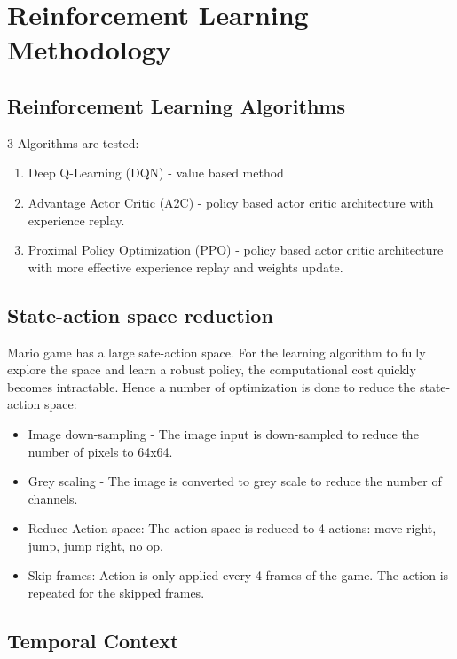 \documentclass[conference]{IEEEtran}
\begin{document}
\section{Reinforcement Learning Methodology}

\subsection{Reinforcement Learning Algorithms}

3 Algorithms are tested:

\begin{enumerate}
    \item Deep Q-Learning (DQN) - value based method
    \item Advantage Actor Critic (A2C) - policy based actor critic architecture with experience replay.
    \item Proximal Policy Optimization (PPO) - policy based actor critic architecture with more effective experience replay and weights update.
\end{enumerate}

\subsection{State-action space reduction}

Mario game has a large sate-action space. For the learning algorithm to fully explore the space and learn a robust policy, the computational cost quickly becomes intractable. Hence a number of optimization is done to reduce the state-action space:

\begin{itemize}
    \item Image down-sampling - The image input is down-sampled to reduce the number of pixels to 64x64.
    \item Grey scaling - The image is converted to grey scale to reduce the number of channels.
    \item Reduce Action space: The action space is reduced to 4 actions: move right, jump, jump right, no op.
    \item Skip frames: Action is only applied every 4 frames of the game. The action is repeated for the skipped frames.
\end{itemize}

\subsection{Temporal Context}
\end{document}
